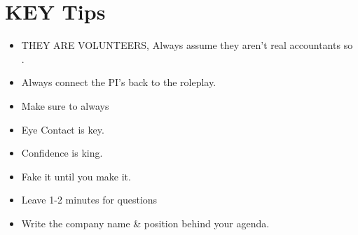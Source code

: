 \section*{KEY Tips}

\begin{itemize}
    \item THEY ARE VOLUNTEERS, Always assume they aren't real accountants so .
    \item Always connect the PI's back to the roleplay.
    \item Make sure to always 
    \item Eye Contact is key.
    \item Confidence is king.
    \item Fake it until you make it.
    \item Leave 1-2 minutes for questions
    \item Write the company name \& position behind your agenda.
\end{itemize}